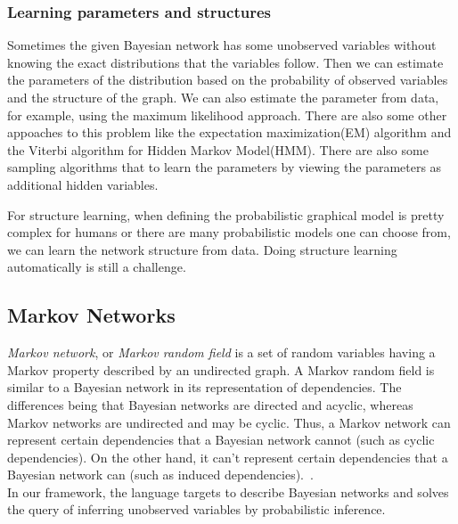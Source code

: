 \subsubsection{Learning parameters and structures}
Sometimes the given Bayesian network has some unobserved variables without knowing the exact distributions that the variables follow. Then we can estimate the parameters of the distribution based on the probability of observed variables and the structure of the graph. We can also estimate the parameter from data, for example, using the maximum likelihood approach. There are also some other appoaches to this problem like the expectation maximization(EM) algorithm and the Viterbi algorithm for Hidden Markov Model(HMM). There are also some sampling algorithms that to learn the parameters by viewing the parameters as additional hidden variables.

For structure learning, when defining the probabilistic graphical model is pretty complex for humans or there are many probabilistic models one can choose from, we can learn the network structure from data. Doing structure learning automatically is still a challenge. 

\subsection{Markov Networks}
\textit{Markov network}, or \textit{Markov random field} is a set of random variables having a Markov property described by an undirected graph. A Markov random field is similar to a Bayesian network in its representation of dependencies. The differences being that Bayesian networks are directed and acyclic, whereas Markov networks are undirected and may be cyclic. Thus, a Markov network can represent certain dependencies that a Bayesian network cannot (such as cyclic dependencies). On the other hand, it can't represent certain dependencies that a Bayesian network can (such as induced dependencies).~\cite{markov}.\\

In our framework, the language targets to describe Bayesian networks and solves the query of inferring unobserved variables by probabilistic inference.

